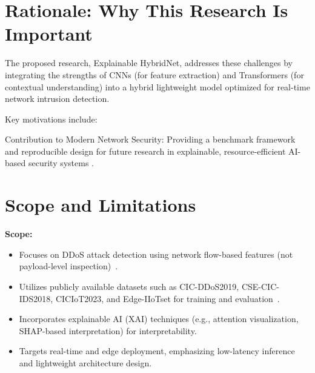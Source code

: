 \documentclass[12pt, a4paper]{report}
\begin{document}
\section{Rationale: Why This Research Is Important}
The proposed research, Explainable HybridNet, addresses these challenges by integrating the strengths of CNNs (for feature extraction) and Transformers (for contextual understanding) into a hybrid lightweight model optimized for real-time network intrusion detection.

Key motivations include:
 \item Contribution to Modern Network Security: Providing a benchmark framework and reproducible design for future research in explainable, resource-efficient AI-based security systems \cite{9shaikh2024advancing_ddos_hybrid}.
\section{Scope and Limitations}
\textbf{Scope:}
\begin{itemize}
 
\item Focuses on DDoS attack detection using network flow-based features (not payload-level inspection)~\cite{10kamal2024advanced_hybrid_transformer_cnn}.
    \item Utilizes publicly available datasets such as CIC-DDoS2019, CSE-CIC-IDS2018, CICIoT2023, and Edge-IIoTset for training and evaluation~\cite{11liu2025ensemble_xai_ids}\cite{12Wahab2025}\cite{neto2023ciciot2023}\cite{ferrag2022edge}.
    \item Incorporates explainable AI (XAI) techniques (e.g., attention visualization, SHAP-based interpretation) for interpretability.
    \item Targets real-time and edge deployment, emphasizing low-latency inference and lightweight architecture design. 
\end{itemize}
\end{document}
